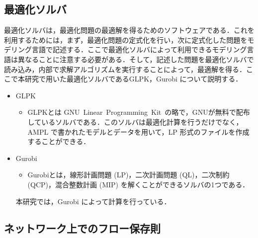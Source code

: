 \documentclass[a4paper,12pt,fleqn]{jarticle}
\begin{document}
\subsection{最適化ソルバ}
\label{subsec:solver}
最適化ソルバは，最適化問題の最適解を得るためのソフトウェアである．これを利用するためには，まず，最適化問題の定式化を行い，次に定式化した問題をモデリング言語で記述する．ここで最適化ソルバによって利用できるモデリング言語は異なることに注意する必要がある．そして，記述した問題を最適化ソルバで読み込み，内部で求解アルゴリズムを実行することによって，最適解を得る．ここで本研究で用いた最適化ソルバであるGLPK，Gurobi について説明する．
\begin{itemize}
\item GLPK\cite{GLPK}
  \begin{itemize}
  \item GLPKとは GNU\ Linear\ Programming\ Kit\ の略で，GNUが無料で配布しているソルバである．このソルバは最適化計算を行うだけでなく，AMPL で書かれたモデルとデータを用いて，LP 形式のファイルを作成することができる．
  \end{itemize}
  
\item Gurobi\cite{Gurobi}
  \begin{itemize}
  \item Gurobiとは，線形計画問題 (LP)，二次計画問題 (QL)，二次制約 (QCP)，混合整数計画 (MIP) を解くことができるソルバの1つである．
  \end{itemize}
  本研究では，Gurobi によって計算を行っている．
\end{itemize}

\subsection{ネットワーク上でのフロー保存則}
\end{document}
